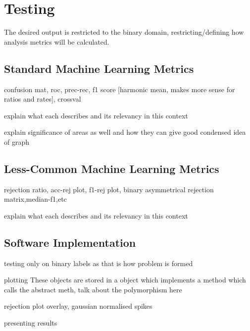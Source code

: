\section{Testing}
\label{sec:pl-test}
    The desired output is restricted to the binary domain, restricting/defining how analysis metrics will be calculated.
    \subsection{Standard Machine Learning Metrics}
    \label{subsec:pl-test-stan}
        \begin{sitemize}
            \item{confusion mat, roc, prec-rec, f1 score [harmonic mean, makes more sense for ratios and rates], crossval}
            \item{explain what each describes and its relevancy in this context}
            \item{explain significance of areas as well and how they can give good condensed idea of graph}
        \end{sitemize}
        
    \subsection{Less-Common Machine Learning Metrics}
    \label{subsec:pl-test-less}
        \begin{sitemize}
            \item{rejection ratio, acc-rej plot, f1-rej plot, binary asymmetrical rejection matrix,median-f1,etc}
            \item{explain what each describes and its relevancy in this context}
        \end{sitemize}
    
    \subsection{Software Implementation}
    \label{subsec:pl-test-software}
        \begin{sitemize}
            \item{testing only on binary labels as that is how problem is formed}
            \item{plotting
            These objects are stored in a  object which implements a  method which calls the abstract meth, talk about the polymorphism here}
            \item{rejection plot overlay, gaussian normalised spikes}
            \item{presenting results}
        \end{sitemize}